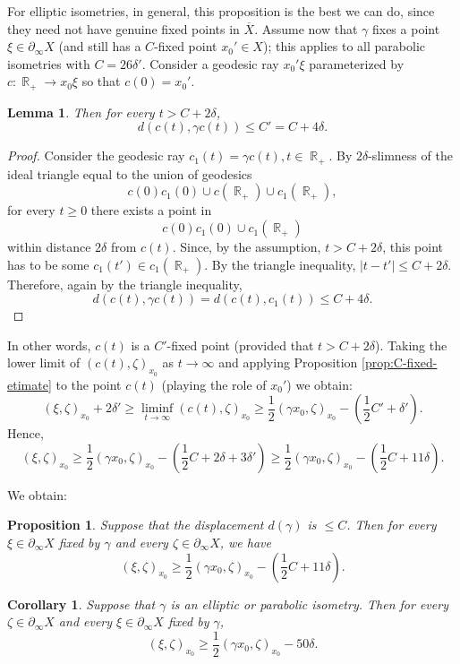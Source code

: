 \documentclass[12pt]{amsbook}%
\newtheorem{lem}[thm]{Lemma}
\newtheorem{prop}[thm]{Proposition}
\newtheorem{cor}[thm]{Corollary}
\theoremstyle{definition}
\theoremstyle{remark}
\numberwithin{section}{chapter}
\numberwithin{subsection}{section}
\numberwithin{figure}{chapter}
\def\half{\frac{1}{2}}
\DeclareMathOperator{\R}{\mathbb{R}}
\def\ga{\gamma}
\def\geo{\partial_\infty}
\def\ol{\overline}
\begin{document}
{{\medskip
For elliptic isometries, in general, this proposition is the best we can do, since they need not have genuine fixed points in $\ol X$. 
Assume now that $\ga$ fixes a point $\xi\in \geo X$ (and still has a $C$-fixed point $x_0'\in X$); this applies to all parabolic isometries with $C=26\delta'$. 
Consider a geodesic ray $x_0'\xi$ parameterized 
by $c: \R_+\to x_0\xi$ so that $c(0)=x_0'$. 

\begin{lem}
Then for every $t > C+2\delta$,
$$
d(c(t), \ga c(t))\leqslant C'= C+4\delta. 
$$
\end{lem}
\begin{proof} Consider the geodesic ray $c_1(t)=\ga c(t), t\in \R_+$. By $2\delta$-slimness of the ideal triangle 
equal to the union of geodesics
$$
c(0) c_1(0) \cup  c(\R_+) \cup c_1(\R_+),
$$
for every $t\geqslant 0$ there exists a point in 
$$
c(0) c_1(0) \cup c_1(\R_+)
$$
within distance $2\delta$ from $c(t)$. Since, by the assumption, $t > C+ 2\delta$, this point has to be some $c_1(t')\in c_1(\R_+)$. 
By the triangle inequality, $|t-t'|\leqslant C+2\delta$. 
Therefore, again by the triangle inequality, 
$$
d(c(t), \ga c(t))= d(c(t), c_1(t)) \leqslant C+4\delta.$$  
 \end{proof}

In other words, $c(t)$ is a $C'$-fixed point (provided that $t> C+2\delta$). 
Taking the lower limit of $(c(t), \zeta)_{x_0}$ as $t\to\infty$ and applying 
Proposition \ref{prop:C-fixed-etimate} to the point $c(t)$ (playing the role of $x_0'$) we obtain:
$$
(\xi, \zeta)_{x_0} + 2\delta' \geqslant \liminf_{t\to\infty} (c(t), \zeta)_{x_0} \geqslant \half (\ga x_0, \zeta)_{x_0} - (\half C' +\delta').
$$
Hence,
$$
(\xi, \zeta)_{x_0} \geqslant  \half (\ga x_0, \zeta)_{x_0} - (\half C + 2\delta + 3\delta')\geqslant  \half (\ga x_0, \zeta)_{x_0} - (\half C + 11\delta). 
$$

We obtain:

\begin{prop}\label{prop:small displacement case} 
Suppose that the displacement $d(\ga)$ is $\leqslant C$. %
Then for every $\xi\in \geo X$ fixed by $\ga$ and every  $\zeta\in \geo X$, we have
$$
(\xi, \zeta)_{x_0} \geqslant   \half (\ga x_0, \zeta)_{x_0} - (\half C + 11\delta). 
$$
\end{prop}

\begin{cor}
Suppose that $\ga$ is an elliptic or parabolic isometry. Then for every $\zeta\in \geo X$ and every $\xi\in \geo X$ fixed by $\ga$, 
$$
(\xi, \zeta)_{x_0} \geqslant   \half (\ga x_0, \zeta)_{x_0} - 50\delta. 
$$
\end{cor}


}}
\end{document}
